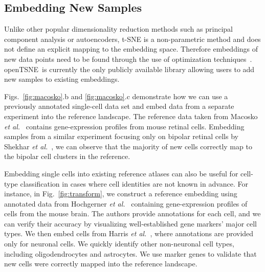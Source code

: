 \documentclass[twocolumn]{bmcart}
\newcommand{\opentsne}{\textsf{openTSNE}}
\begin{document}
\subsection*{Embedding New Samples}

Unlike other popular dimensionality reduction methods such as principal
component analysis or autoencoders, t-SNE is a non-parametric method and does
not define an explicit mapping to the embedding space. Therefore embeddings of
new data points need to be found through the use of optimization
techniques~\cite{policar2019embedding}. \opentsne\ is currently the only
publicly available library allowing users to add new samples to existing
embeddings.

Figs.~\ref{fig:macosko}.b and \ref{fig:macosko}.c demonstrate how we can use a
previously annotated single-cell data set and embed data from a separate
experiment into the reference landscape. The reference data taken from Macosko
\textit{et al.}~\cite{macosko2015highly} contains gene-expression profiles from
mouse retinal cells. Embedding samples from a similar experiment focusing only
on bipolar retinal cells by Shekhar \textit{et
al.}~\cite{shekhar2016comprehensive}, we can observe that the majority of new
cells correctly map to the bipolar cell clusters in the reference.

Embedding single cells into existing reference atlases can also be useful for
cell-type classification in cases where cell identities are not known in
advance. For instance, in Fig.~\ref{fig:transform}, we construct a reference
embedding using annotated data from Hochgerner \textit{et
al.}~\cite{hochgerner2018conserved} containing gene-expression profiles of
cells from the mouse brain. The authors provide annotations for each cell, and
we can verify their accuracy by visualizing well-established gene markers'
major cell types. We then embed cells from Harris \textit{et
al.}~\cite{harris2018classes}, where annotations are provided only for neuronal
cells. We quickly identify other non-neuronal cell types, including
oligodendrocytes and astrocytes. We use marker genes to validate that new cells
were correctly mapped into the reference landscape.
\end{document}
